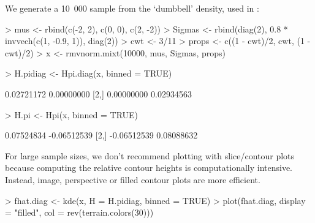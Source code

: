 \documentclass[a4paper,11pt]{article}
\begin{document}
We generate a 10~000 sample from the `dumbbell' density, used in 
\citet*{duong2005}:
\begin{Schunk}
\begin{Sinput}
> mus <- rbind(c(-2, 2), c(0, 0), c(2, -2))
> Sigmas <- rbind(diag(2), 0.8 * invvech(c(1, -0.9, 1)), diag(2))
> cwt <- 3/11
> props <- c((1 - cwt)/2, cwt, (1 - cwt)/2)
> x <- rmvnorm.mixt(10000, mus, Sigmas, props)
\end{Sinput}
\end{Schunk}
\begin{Schunk}
\begin{Sinput}
> H.pidiag <- Hpi.diag(x, binned = TRUE)
\end{Sinput}
\begin{Soutput}
           [,1]       [,2]
[1,] 0.02721172 0.00000000
[2,] 0.00000000 0.02934563
\end{Soutput}
\begin{Sinput}
> H.pi <- Hpi(x, binned = TRUE)
\end{Sinput}
\begin{Soutput}
            [,1]        [,2]
[1,]  0.07524834 -0.06512539
[2,] -0.06512539  0.08088632
\end{Soutput}
\end{Schunk}
For large sample sizes, we don't recommend plotting with slice/contour plots
because computing the relative contour heights is computationally intensive.
Instead, image, perspective or filled contour plots are more efficient.
\begin{Schunk}
\begin{Sinput}
> fhat.diag <- kde(x, H = H.pidiag, binned = TRUE)
> plot(fhat.diag, display = "filled", col = rev(terrain.colors(30)))
\end{Sinput}
\end{Schunk}
\end{document}
